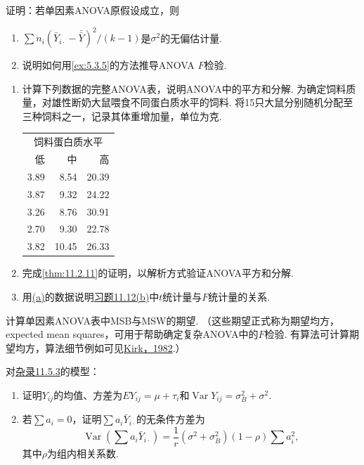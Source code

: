 \begin{exercise}\label{exercise:11.20}
证明：若单因素ANOVA原假设成立，则
\begin{enumerate}[label=(\alph*)]
\item\label{item:11.20.a} $\sum n_i(\bar Y_{i\cdot}-\bar{\bar Y})^2/(k-1)$是$\sigma^2$的无偏估计量.
\item\label{item:11.20.b} 说明如何用\autoref{ex:5.3.5}的方法推导ANOVA $F$检验.
\end{enumerate}
\end{exercise}

\begin{exercise}\label{exercise:11.21}\leavevmode
\begin{enumerate}[label=(\alph*)]
\item\label{item:11.21.a} 计算下列数据的完整ANOVA表，说明ANOVA中的平方和分解. 为确定饲料质量，对雄性断奶大鼠喂食不同蛋白质水平的饲料. 将15只大鼠分别随机分配至三种饲料之一，记录其体重增加量，单位为克.
\begin{center}
\begin{tabular}{rrr}
\toprule\multicolumn{3}{c}{饲料蛋白质水平}\\
低&中&高\\\midrule
3.89&8.54&20.39\\3.87&9.32&24.22\\3.26&8.76&30.91\\2.70&9.30&22.78\\3.82&10.45&26.33\\\bottomrule
\end{tabular}
\end{center}
\item\label{item:11.21.b} 完成\autoref{thm:11.2.11}的证明，以解析方式验证ANOVA平方和分解.
\item\label{item:11.21.c} 用\hyperref[item:11.21.a]{(a)}的数据说明\hyperref[item:11.12.b]{习题11.12(b)}中$t$统计量与$F$统计量的关系.
\end{enumerate}
\end{exercise}

\begin{exercise}\label{exercise:11.22}
计算单因素ANOVA表中MSB与MSW的期望. （这些期望正式称为期望均方，expected mean squares，可用于帮助确定复杂ANOVA中的$F$检验. 有算法可计算期望均方，算法细节例如可见\hyperref[bib:source190]{Kirk，1982}.）
\end{exercise}

\begin{exercise}\label{exercise:11.23}
对\hyperref[sec:11.5.3]{杂录11.5.3}的模型：
\begin{enumerate}[label=(\alph*)]
\item\label{item:11.23.a} 证明$Y_{ij}$的均值、方差为$EY_{ij}=\mu+\tau_i$和$\operatorname{Var}Y_{ij}=\sigma_B^2+\sigma^2$.
\item\label{item:11.23.b} 若$\sum a_i=0$，证明$\sum a_i\bar Y_{i\cdot}$的无条件方差为
$$\operatorname{Var}\left(\sum a_i\bar Y_{i\cdot}\right)=\frac1r(\sigma^2+\sigma_B^2)(1-\rho)\sum a_i^2,$$
其中$\rho$为组内相关系数.
\end{enumerate}
\end{exercise}

